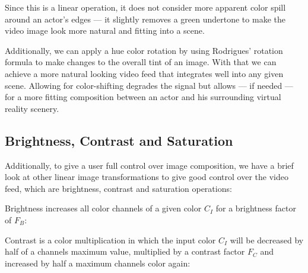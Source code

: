 

Since this is a linear operation, it does not consider more apparent color 
spill around an actor's edges --- it slightly removes a green undertone to make 
the video image look more natural and fitting into a scene.

Additionally, we can apply a hue color rotation by using Rodrigues' rotation 
formula to make changes to the overall tint of an 
image\cite{shagam:hsv-rotation}. With that we can achieve a more natural 
looking video feed that integrates well into any given scene. Allowing for 
color-shifting degrades the signal but allows --- if needed --- for a more 
fitting composition between an actor and his surrounding virtual reality 
scenery.

\subsection{Brightness, Contrast and Saturation}

Additionally, to give a user full control over image composition, we have a 
brief look at other linear image transformations to give good control over the 
video feed, which are brightness, contrast and saturation operations:

Brightness increases all color channels of a given color $C_I$ for a brightness 
factor of $F_B$:


Contrast is a color multiplication in which the input color $C_I$ will be 
decreased by half of a channels maximum value, multiplied by a contrast factor 
$F_C$ and increased by half a maximum channels color again:

